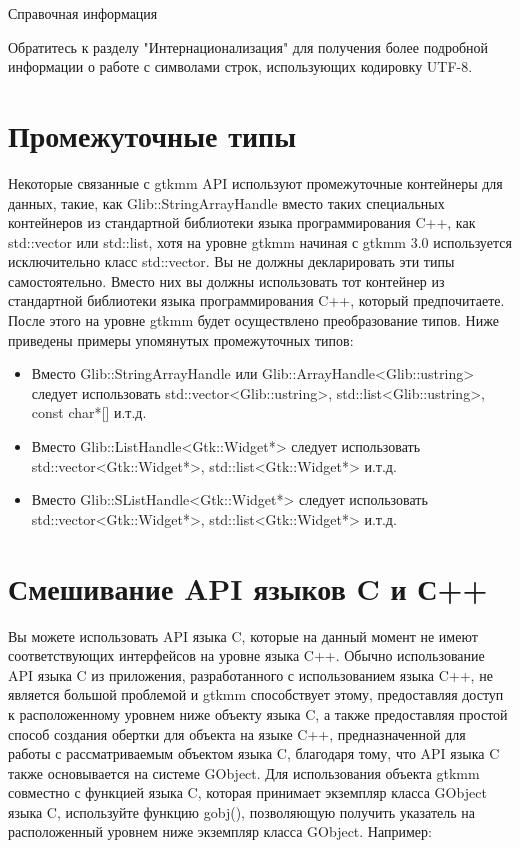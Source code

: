 Справочная информация

Обратитесь к разделу "Интернационализация" для получения более подробной информации о работе с символами строк, использующих кодировку UTF-8. 

\section{Промежуточные типы}
 Некоторые связанные с gtkmm API используют промежуточные контейнеры для данных, такие, как Glib::StringArrayHandle вместо таких специальных контейнеров из стандартной библиотеки языка программирования C++, как std::vector или std::list, хотя на уровне gtkmm начиная с gtkmm 3.0 используется исключительно класс std::vector.
Вы не должны декларировать эти типы самостоятельно. Вместо них вы должны использовать тот контейнер из стандартной библиотеки языка программирования C++, который предпочитаете. После этого на уровне gtkmm будет осуществлено преобразование типов. Ниже приведены примеры упомянутых промежуточных типов:
\begin{itemize}
	\item Вместо Glib::StringArrayHandle или Glib::ArrayHandle<Glib::ustring> следует  использовать std::vector<Glib::ustring>, std::list<Glib::ustring>, const char*[] и.т.д.
	\item Вместо Glib::ListHandle<Gtk::Widget*> следует использовать std::vector<Gtk::Widget*>, std::list<Gtk::Widget*> и.т.д.
	\item Вместо Glib::SListHandle<Gtk::Widget*> следует использовать std::vector<Gtk::Widget*>, std::list<Gtk::Widget*> и.т.д.
	
\end{itemize}

\section{Смешивание API языков C и С++}
 Вы можете использовать API языка C, которые на данный момент не имеют соответствующих интерфейсов на уровне языка C++. Обычно использование API языка C из приложения, разработанного с использованием языка C++, не является большой проблемой и gtkmm способствует этому, предоставляя доступ к расположенному уровнем ниже объекту языка C, а также предоставляя простой способ создания обертки для объекта на языке C++, предназначенной для работы с рассматриваемым объектом языка C, благодаря тому, что API языка C также основывается на системе GObject.
Для использования объекта gtkmm совместно с функцией языка C, которая принимает экземпляр класса GObject языка C, используйте функцию gobj(), позволяющую получить указатель на расположенный уровнем ниже экземпляр класса GObject. Например:

